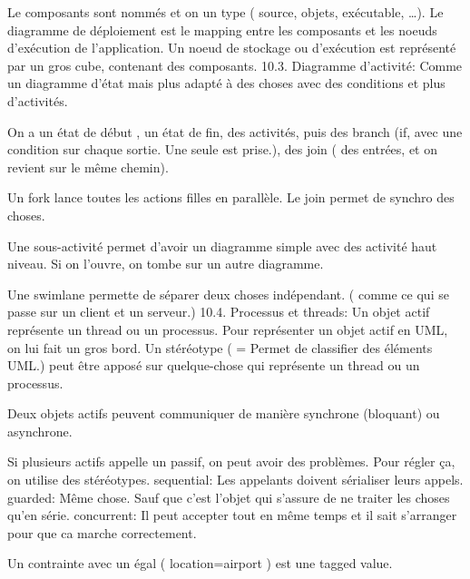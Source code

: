 Le composants sont nommés et on un type ( source, objets, exécutable, …).
Le diagramme de déploiement est le mapping entre les composants et les noeuds d’exécution de l’application.
Un noeud de stockage ou d’exécution est représenté par un gros cube, contenant des composants.
10.3. Diagramme d’activité:
Comme un diagramme d’état mais plus adapté à des choses avec des conditions et plus d’activités.

On a un état de début , un état de fin, des activités, puis des branch (if, avec une condition sur chaque sortie. Une seule est prise.), des join ( des entrées, et on revient sur le même chemin).

Un fork lance toutes les actions filles en parallèle. Le join permet de synchro des choses.

Une sous-activité permet d’avoir un diagramme simple avec des activité haut niveau. Si on l’ouvre, on tombe sur un autre diagramme.

Une swimlane permette de séparer deux choses indépendant. ( comme ce qui se passe sur un client et un serveur.)
10.4. Processus et threads:
Un objet actif représente un thread ou un processus.
Pour représenter un objet actif en UML, on lui fait un gros bord.
Un stéréotype ( = Permet de classifier des éléments UML.) peut être apposé sur quelque-chose qui représente un thread ou un processus.

Deux objets actifs peuvent communiquer de manière synchrone (bloquant) ou asynchrone.

Si plusieurs actifs appelle un passif, on peut avoir des problèmes. Pour régler ça, on utilise des stéréotypes.
sequential: Les appelants doivent sérialiser leurs appels.
guarded: Même chose. Sauf que c’est l’objet qui s’assure de ne traiter les choses qu’en série.
concurrent: Il peut accepter tout en même temps et il sait s’arranger pour que ca marche correctement.

Un contrainte avec un égal ( {location=airport} ) est une tagged value.
